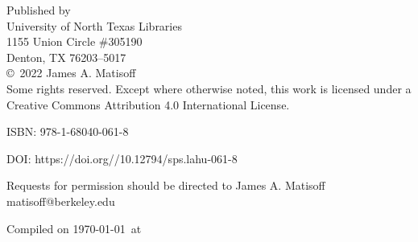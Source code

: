 \thispagestyle{empty}
\begin{center}
\vspace*{\fill}
Published by \\
University of North Texas Libraries \\
1155 Union Circle \#305190 \\
Denton, TX  76203–5017 \\
\vspace{10em}
\copyright \ 2022 James A. Matisoff \\
Some rights reserved. Except where otherwise noted, this work is licensed under a Creative Commons Attribution 4.0 International License.

ISBN: 978-1-68040-061-8

DOI: https://doi.org//10.12794/sps.lahu-061-8


Requests for permission should be directed to James A. Matisoff matisoff@berkeley.edu

\vspace{4em}
Compiled on \today\ at \currenttime
\vspace*{\fill}
\end{center}